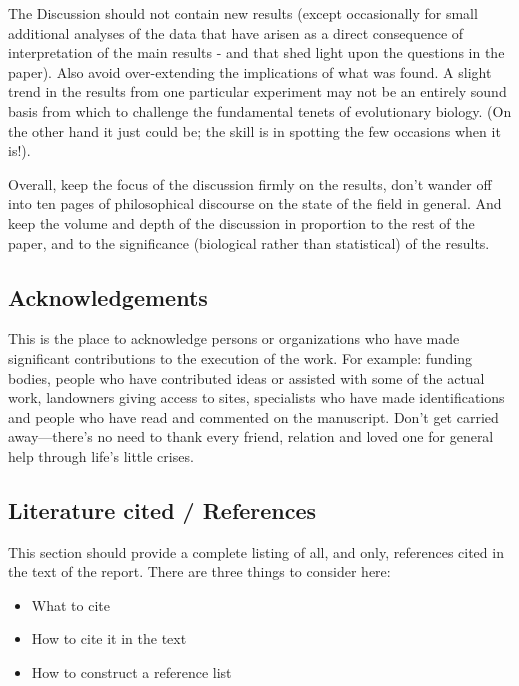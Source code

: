 \documentclass[
]{book}
\begin{document}
The Discussion should not contain new results (except occasionally for small additional analyses of the data that have arisen as a direct consequence of interpretation of the main results - and that shed light upon the questions in the paper). Also avoid over-extending the implications of what was found. A slight trend in the results from one particular experiment may not be an entirely sound basis from which to challenge the fundamental tenets of evolutionary biology. (On the other hand it just could be; the skill is in spotting the few occasions when it is!).

Overall, keep the focus of the discussion firmly on the results, don't wander off into ten pages of philosophical discourse on the state of the field in general. And keep the volume and depth of the discussion in proportion to the rest of the paper, and to the significance (biological rather than statistical) of the results.

\hypertarget{acknowledgements}{%
\subsection{Acknowledgements}\label{acknowledgements}}

This is the place to acknowledge persons or organizations who have made significant contributions to the execution of the work. For example: funding bodies, people who have contributed ideas or assisted with some of the actual work, landowners giving access to sites, specialists who have made identifications and people who have read and commented on the manuscript. Don't get carried away---there's no need to thank every friend, relation and loved one for general help through life's little crises.

\hypertarget{literature-cited-references}{%
\subsection{Literature cited / References}\label{literature-cited-references}}

This section should provide a complete listing of all, and only, references cited in the text of the report. There are three things to consider here:

\begin{itemize}
\item
  What to cite
\item
  How to cite it in the text
\item
  How to construct a reference list
\end{itemize}
\end{document}
